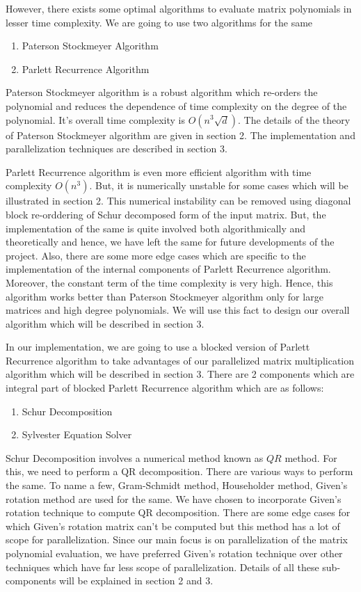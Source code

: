 \documentclass[12pt,a4paper]{article}
\begin{document}
However, there exists some optimal algorithms to evaluate matrix polynomials in lesser time complexity. We are going to use two algorithms for the same
\begin{enumerate}
    \item Paterson Stockmeyer Algorithm
    \item Parlett Recurrence Algorithm
\end{enumerate}

Paterson Stockmeyer algorithm is a robust algorithm which re-orders the polynomial and reduces the dependence of time complexity on the degree of the polynomial. It's overall time complexity is $O(n^{3}\sqrt{d})$. The details of the theory of Paterson Stockmeyer algorithm are given in section 2. The implementation and parallelization techniques are described in section 3.

Parlett Recurrence algorithm is even more efficient algorithm with time complexity $O(n^{3})$. But, it is numerically unstable for some cases which will be illustrated in section 2. This numerical instability can be removed using diagonal block re-orddering of Schur decomposed form of the input matrix. But, the implementation of the same is quite involved both algorithmically and theoretically and hence, we have left the same for future developments of the project. Also, there are some more edge cases which are specific to the implementation of the internal components of Parlett Recurrence algorithm. Moreover, the constant term of the time complexity is very high. Hence, this algorithm works better than Paterson Stockmeyer algorithm only for large matrices and high degree polynomials. We will use this fact to design our overall algorithm which will be described in section 3.

\newpage
In our implementation, we are going to use a blocked version of Parlett Recurrence algorithm to take advantages of our parallelized matrix multiplication algorithm which will be described in section 3. There are 2 components which are integral part of blocked Parlett Recurrence algorithm which are as follows:
\begin{enumerate}
    \item Schur Decomposition
    \item Sylvester Equation Solver
\end{enumerate}

Schur Decomposition involves a numerical method known as $QR$ method. For this, we need to perform a QR decomposition. There are various ways to perform the same. To name a few, Gram-Schmidt method, Householder method, Given's rotation method are used for the same. We have chosen to incorporate Given's rotation technique to compute QR decomposition. There are some edge cases for which Given's rotation matrix can't be computed but this method has a lot of scope for parallelization. Since our main focus is on parallelization of the matrix polynomial evaluation, we have preferred Given's rotation technique over other techniques which have far less scope of parallelization. Details of all these sub-components will be explained in section 2 and 3.
\end{document}
